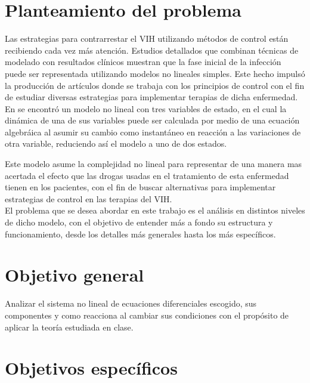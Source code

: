 \documentclass{article}
\begin{document}


\section{Planteamiento del problema}

Las estrategias para contrarrestar el VIH utilizando métodos de control están
recibiendo cada vez más atención. Estudios detallados que combinan
técnicas de modelado con resultados clínicos muestran que la fase inicial de la
infección puede ser representada utilizando modelos no lineales simples.\cite{paper}
Este hecho impulsó la producción de artículos donde se trabaja con los principios
de control con el fin de estudiar diversas estrategias para implementar terapias de dicha
enfermedad.\\

En \cite{model} se encontró un modelo no lineal con tres variables de estado, en el
cual la dinámica de una de sus variables puede ser calculada por medio de una
ecuación algebráica al asumir su cambio como instantáneo en reacción a las variaciones
de otra variable, reduciendo así el modelo a uno de dos estados.

Este modelo asume la complejidad no lineal para representar de una manera
mas acertada el efecto que las drogas usadas en el tratamiento de esta
enfermedad tienen en los pacientes, con el fin de buscar alternativas para
implementar estrategias de control en las terapias del VIH.\\

El problema que se desea abordar en este trabajo es el análisis en distintos niveles
de dicho modelo, con el objetivo de entender más a fondo su estructura y
funcionamiento, desde los detalles más generales hasta los más específicos.

\section{Objetivo general}

Analizar el sistema no lineal de ecuaciones diferenciales escogido, sus componentes y
como reacciona al cambiar sus condiciones con el propósito de aplicar la teoría
estudiada en clase.

\section{Objetivos específicos}
\end{document}
